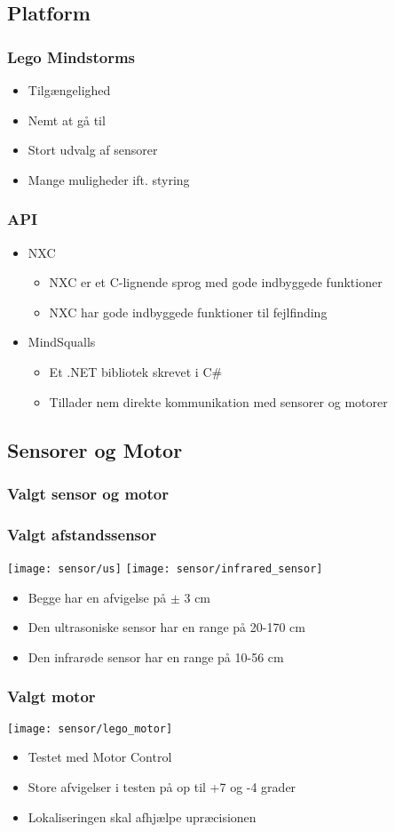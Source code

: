 \subsection{Platform}
\begin{frame}
\frametitle{Lego Mindstorms}
\begin{itemize}
\item Tilgængelighed
\item Nemt at gå til
\item Stort udvalg af sensorer
\item Mange muligheder ift. styring
\end{itemize}
\end{frame}

\begin{frame}
\frametitle{API}
\begin{itemize}
\item NXC
\begin{itemize}
\item NXC er et C-lignende sprog med gode indbyggede funktioner
\item NXC har gode indbyggede funktioner til fejlfinding
\end{itemize}
\item MindSqualls
\begin{itemize}
\item Et .NET bibliotek skrevet i C\#
\item Tillader nem direkte kommunikation med sensorer og motorer
\end{itemize}
\end{itemize}
\end{frame}
\subsection{Sensorer og Motor}
\frametitle{Valgt sensor og motor}
\begin{frame}
\frametitle{Valgt afstandssensor}
\center
\texttt{[image: sensor/us]}
\texttt{[image: sensor/infrared\_sensor]}
\begin{itemize}
\item Begge har en afvigelse på $\pm$ 3 cm
\item Den ultrasoniske sensor har en range på 20-170 cm
\item Den infrarøde sensor har en range på 10-56 cm
\end{itemize}
\end{frame}
\begin{frame}
\frametitle{Valgt motor}
\center
\texttt{[image: sensor/lego\_motor]}
\begin{itemize}
\item Testet med Motor Control
\item Store afvigelser i testen på op til +7 og -4 grader
\item Lokaliseringen skal afhjælpe upræcisionen
\end{itemize}
\end{frame}
